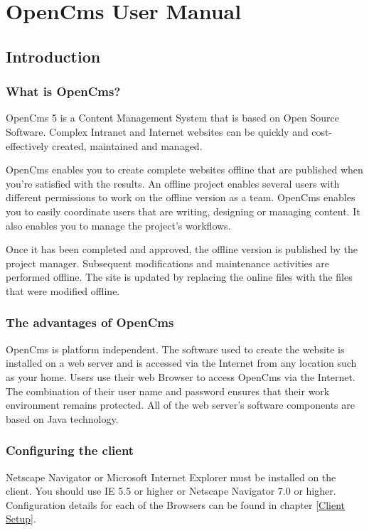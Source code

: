 \chapter{OpenCms User Manual}
\label{OpenCms User Manual}

\section{Introduction}

\subsection{What is OpenCms?}

OpenCms 5 is a Content Management System that is based on Open
Source Software. Complex Intranet and Internet websites can be
quickly and cost-effectively created, maintained and managed.

OpenCms enables you to create complete websites offline that are
published when you're satisfied with the results. An offline
project enables several users with different permissions to work
on the offline version as a team. OpenCms enables you to easily
coordinate users that are writing, designing or managing content.
It also enables you to manage the project's workflows.

Once it has been completed and approved, the offline version is
published by the project manager. Subsequent modifications and
maintenance activities are performed offline. The site is updated
by replacing the online files with the files that were modified
offline.

\subsection{The advantages of OpenCms}

OpenCms is platform independent. The software used to create the
website is installed on a web server and is accessed via the
Internet from any location such as your home. Users use their web
Browser to access OpenCms via the Internet. The combination of
their user name and password ensures that their work environment
remains protected. All of the web server's software components are
based on Java technology.

\subsection{Configuring the client}

Netscape Navigator or Microsoft Internet Explorer must be
installed on the client. You should use IE 5.5 or higher or
Netscape Navigator 7.0 or higher. Configuration details for each of
the Browsers can be found in chapter \ref{Client Setup}. 

